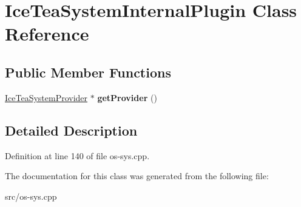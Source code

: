 \hypertarget{class_ice_tea_system_internal_plugin}{}\section{Ice\+Tea\+System\+Internal\+Plugin Class Reference}
\label{class_ice_tea_system_internal_plugin}
\subsection*{Public Member Functions}
\begin{DoxyCompactItemize}
\item 
\hyperlink{class_ice_tea_system_provider}{Ice\+Tea\+System\+Provider} $\ast$ {\bfseries get\+Provider} ()\hypertarget{class_ice_tea_system_internal_plugin_a965e1869c91d69d0cce2a4b7f8e3b46d}{}\label{class_ice_tea_system_internal_plugin_a965e1869c91d69d0cce2a4b7f8e3b46d}

\end{DoxyCompactItemize}


\subsection{Detailed Description}


Definition at line 140 of file os-\/sys.\+cpp.



The documentation for this class was generated from the following file\+:\begin{DoxyCompactItemize}
\item 
src/os-\/sys.\+cpp\end{DoxyCompactItemize}
